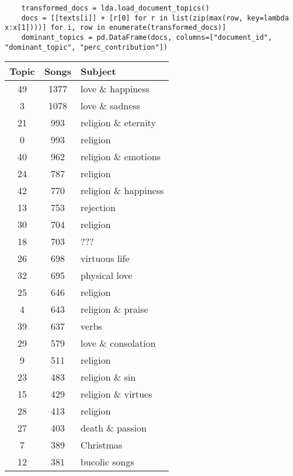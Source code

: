 \begin{lstlisting}
	transformed_docs = lda.load_document_topics()
	docs = [[texts[i]] + [r[0] for r in list(zip(max(row, key=lambda x:x[1])))] for i, row in enumerate(transformed_docs)]
	dominant_topics = pd.DataFrame(docs, columns=["document_id", "dominant_topic", "perc_contribution"])
\end{lstlisting}

\begin{table}
	\begin{minipage}{0.5\textwidth}
		\begin{tabular}{ccl}
			\toprule
			Topic & Songs & Subject \\
			\midrule
			49             &  1377 & love \& happiness \\
			3              &  1078 & love \& sadness \\
			21             &   993 & religion \& eternity \\
			0              &   993 & religion \\
			40             &   962 & religion \& emotions \\
			24             &   787 & religion \\
			42             &   770 & religion \& happiness \\
			13             &   753 & rejection \\
			30             &   704 & religion \\
			18             &   703 & ??? \\
			26             &   698 & virtuous life \\
			32             &   695 & physical love \\
			25             &   646 & religion \\
			4              &   643 & religion \& praise \\
			39             &   637 & verbs \\
			29             &   579 & love \& consolation \\
			9              &   511 & religion \\
			23             &   483 & religion \& sin \\
			15             &   429 & religion \& virtues \\
			28             &   413 & religion \\
			27             &   403 & death \& passion\\
			7              &   389 & Christmas \\
			12             &   381 & bucolic songs \\

\end{tabular}
\end{minipage}
\end{table}

